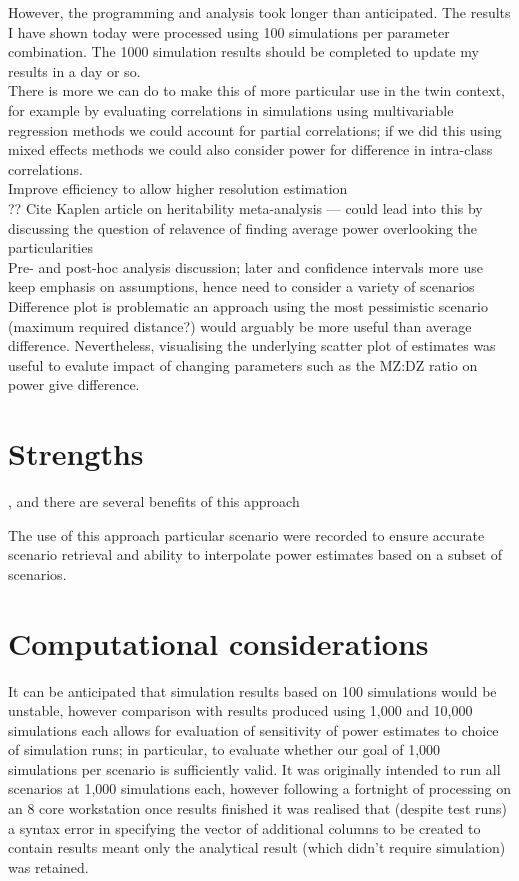 
However, the programming and analysis took longer than anticipated.  The results I have shown today were processed using 100 simulations per parameter combination.  The 1000 simulation results should be completed to update my results in a day or so.
\\
There is more we can do to make this of more particular use in the twin context, for example by evaluating correlations in simulations using multivariable regression methods we could account for partial correlations; if we did this using mixed effects methods we could also consider power for difference in intra-class correlations.
\\
Improve efficiency to allow higher resolution estimation
\\

??
Cite Kaplen article on heritability meta-analysis --- could lead into this by discussing the question of relavence of finding average power overlooking the particularities
\\
Pre- and post-hoc analysis discussion; later and confidence intervals more use
\\
keep emphasis on assumptions, hence need to consider a variety of scenarios
\\

Difference plot is problematic \; an approach using the most pessimistic scenario (maximum required distance?) would arguably be more useful than average difference.  Nevertheless, visualising the underlying scatter plot of estimates was useful to evalute impact of changing parameters such as the MZ:DZ ratio on power give difference.


\section{Strengths}
, and there are several benefits of this approach

The use of this approach 
particular scenario were recorded to ensure accurate scenario retrieval and ability to interpolate power estimates based on a subset of scenarios.  


\section{Computational considerations}
It can be anticipated that simulation results based on 100 simulations would be unstable, however comparison with results produced using 1,000 and 10,000 simulations each allows for evaluation of sensitivity of power estimates to choice of simulation runs; in particular, to evaluate whether our goal of 1,000 simulations per scenario is sufficiently valid.  It was originally intended to run all scenarios at 1,000 simulations each, however following a fortnight of processing on an 8 core workstation once results finished it was realised that (despite test runs) a syntax error in specifying the vector of additional columns to be created to contain results meant only the analytical result (which didn't require simulation) was retained.

